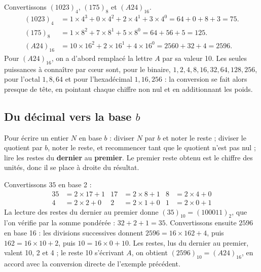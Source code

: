 \begin{exemple}
Convertissons $(1023)_4$, $(175)_8$ et $(A24)_{16}$.
\begin{align*}
(1023)_4 &= 1\times 4^{3} + 0\times 4^{2} + 2\times 4^{1} + 3\times 4^{0} = 64 + 0 + 8 + 3 = 75 .\\
(175)_8 &= 1\times 8^{2} + 7\times 8^{1} + 5\times 8^{0} = 64 + 56 + 5 = 125 .\\
(A24)_{16} &= 10\times 16^{2} + 2\times 16^{1} + 4\times 16^{0} = 2560 + 32 + 4 = 2596 .
\end{align*}
Pour $(A24)_{16}$, on a d'abord remplacé la lettre $A$ par sa valeur 10. Les seules puissances à connaître par cœur sont, pour le binaire, $1, 2, 4, 8, 16, 32, 64, 128, 256$, pour l'octal $1, 8, 64$ et pour l'hexadécimal $1, 16, 256$ : la conversion se fait alors presque de tête, en pointant chaque chiffre non nul et en additionnant les poids.
\end{exemple}

\subsection{Du décimal vers la base \texorpdfstring{$b$}{b}}

\begin{methode}
Pour écrire un entier $N$ en base $b$ : diviser $N$ par $b$ et noter le reste ; diviser le quotient par $b$, noter le reste, et recommencer tant que le quotient n'est pas nul ; lire les restes du \textbf{dernier} au \textbf{premier}. Le premier reste obtenu est le chiffre des unités, donc il se place à droite du résultat.
\end{methode}

\begin{exemple}
Convertissons $35$ en base 2 :
\begin{align*}
35 &= 2\times 17 + 1 & 17 &= 2\times 8 + 1 & 8 &= 2\times 4 + 0\\
4 &= 2\times 2 + 0 & 2 &= 2\times 1 + 0 & 1 &= 2\times 0 + 1
\end{align*}
La lecture des restes du dernier au premier donne $(35)_{10} = (100011)_2$, que l'on vérifie par la somme pondérée : $32 + 2 + 1 = 35$. Convertissons ensuite $2596$ en base 16 : les divisions successives donnent $2596 = 16\times 162 + 4$, puis $162 = 16\times 10 + 2$, puis $10 = 16\times 0 + 10$. Les restes, lus du dernier au premier, valent 10, 2 et 4 ; le reste 10 s'écrivant $A$, on obtient $(2596)_{10} = (A24)_{16}$, en accord avec la conversion directe de l'exemple précédent.
\end{exemple}

